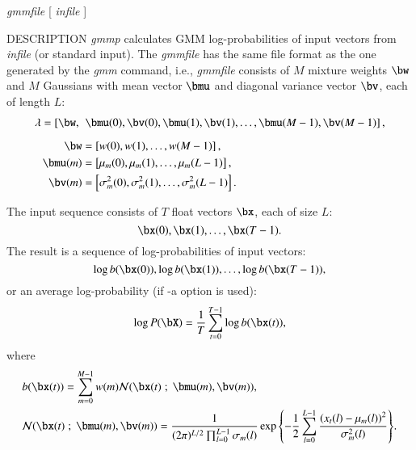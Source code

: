 \begin{synopsis}
\item [gmmp] [ --l $L$ ] [ --m $M$ ] [ --a ] [ --f ] [ --B $B1,B2,...$
] [ --c1 ] [ --c2 ] {\em gmmfile} [ {\em infile} ]
\end{synopsis}

\begin{qsection}{DESCRIPTION}
{\em gmmp} calculates GMM log-probabilities of input vectors from {\em
infile} (or standard input). 
The {\em gmmfile} has the same file format as the one generated by the {\em gmm} command,
i.e., {\em gmmfile} consists of $M$ mixture weights
$\bw$ and $M$ Gaussians with mean vector $\bmu$ and diagonal variance vector
$\bv$, each of length $L$:
\begin{align}
 \lambda =
 \left[\bw,\right.&\left.\bmu(0),\bv(0), \bmu(1), \bv(1),
 \ldots, \bmu(M-1), \bv(M-1)\right],\notag\\[2mm]
 \bw &=\left[ w(0), w(1), \ldots, w(M-1) \right],\notag\\
 \bmu(m) &=\left[\mu_m(0), \mu_m(1), \ldots, \mu_m(L-1)\right],\notag\\
 \bv(m) &=\left[\sigma_m^2(0), \sigma_m^2(1), \ldots,
 \sigma_m^2(L-1)\right].\notag
\end{align}


The input sequence consists of $T$ float vectors $\bx$, each of
size $L$:
\begin{displaymath}
 \bx(0), \bx(1), \dots, \bx(T-1).
\end{displaymath}
The result is a sequence of log-probabilities of input vectors:
\begin{displaymath}
 \log b(\bx(0)), \log b(\bx(1)), \ldots, \log b(\bx(T-1)),
\end{displaymath}
or an average log-probability (if -a option is used):
\begin{displaymath}
 \log P(\bX) = \frac{1}{T}\sum_{t=0}^{T-1}\log b(\bx(t)),
\end{displaymath}
where
\begin{align}
 &b(\bx(t)) =\sum_{m=0}^{M-1}
 w(m){\cal N}(\bx(t) \; ; \; \bmu(m),\bv(m)),\notag\\
 &{\cal N}(\bx(t) \; ; \; \bmu(m),\bv(m))%
  =\frac{1}{(2\pi)^{L/2}\prod_{l=0}^{L-1}\sigma_m(l)}%
  \exp{\left\{-\frac{1}{2}%
    \sum_{l=0}^{L-1}
    \frac{\left(x_t(l)-\mu_m(l)\right)^2}%
    {\sigma_m^2(l)}\right\}}.\notag
\end{align}

\end{qsection}

